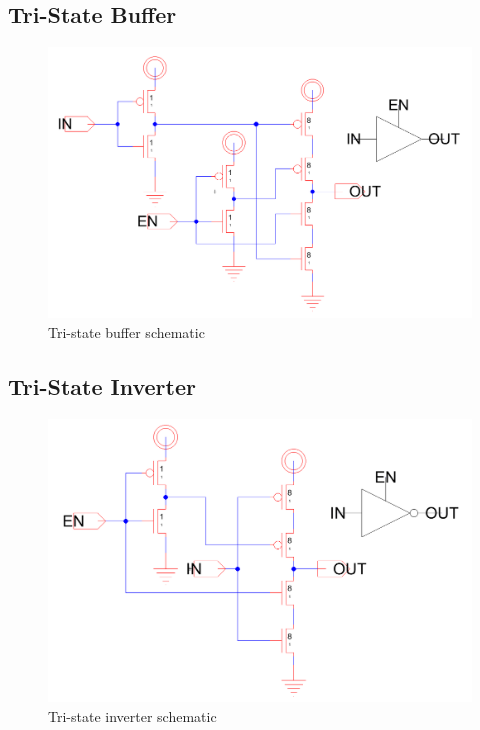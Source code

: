 \documentclass[12pt]{report}
\begin{document}
\subsection*{Tri-State Buffer}
\begin{figure}[H]
  \centering
    \includegraphics[width=1.0\textwidth]{Schematics/tristate_buffer_schematic.PNG}
  \caption{Tri-state buffer schematic}
  \label{fig:tristate_buffer_schematic}
\end{figure}

\subsection*{Tri-State Inverter}
\begin{figure}[H]
  \centering
    \includegraphics[width=1.0\textwidth]{Schematics/tristate_inverter_schematic.PNG}
  \caption{Tri-state inverter schematic}
  \label{fig:tristate_inverter_schematic}
\end{figure}
\end{document}
